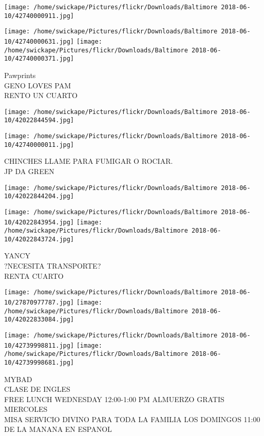 \documentclass[10pt,letterpaper]{article}
\begin{document}
\texttt{[image: /home/swickape/Pictures/flickr/Downloads/Baltimore 2018-06-10/42740000911.jpg]}

\vspace{0.25in}
\texttt{[image: /home/swickape/Pictures/flickr/Downloads/Baltimore 2018-06-10/42740000631.jpg]}
\texttt{[image: /home/swickape/Pictures/flickr/Downloads/Baltimore 2018-06-10/42740000371.jpg]}

Pawprints\\
GENO LOVES PAM\\
RENTO UN CUARTO\\
\pagebreak

\texttt{[image: /home/swickape/Pictures/flickr/Downloads/Baltimore 2018-06-10/42022844594.jpg]}

\vspace{0.25in}
\texttt{[image: /home/swickape/Pictures/flickr/Downloads/Baltimore 2018-06-10/42740000011.jpg]}

CHINCHES LLAME PARA FUMIGAR O ROCIAR.\\
JP DA GREEN\\
\pagebreak

\texttt{[image: /home/swickape/Pictures/flickr/Downloads/Baltimore 2018-06-10/42022844204.jpg]}

\vspace{0.25in}
\texttt{[image: /home/swickape/Pictures/flickr/Downloads/Baltimore 2018-06-10/42022843954.jpg]}
\texttt{[image: /home/swickape/Pictures/flickr/Downloads/Baltimore 2018-06-10/42022843724.jpg]}

YANCY\\
?NECESITA TRANSPORTE?\\
RENTA CUARTO\\
\pagebreak

\texttt{[image: /home/swickape/Pictures/flickr/Downloads/Baltimore 2018-06-10/27870977787.jpg]}
\texttt{[image: /home/swickape/Pictures/flickr/Downloads/Baltimore 2018-06-10/42022833084.jpg]}

\texttt{[image: /home/swickape/Pictures/flickr/Downloads/Baltimore 2018-06-10/42739998811.jpg]}
\texttt{[image: /home/swickape/Pictures/flickr/Downloads/Baltimore 2018-06-10/42739998681.jpg]}

MYBAD\\
CLASE DE INGLES\\
FREE LUNCH WEDNESDAY 12:00{-}1:00 PM ALMUERZO GRATIS MIERCOLES\\
MISA SERVICIO DIVINO PARA TODA LA FAMILIA LOS DOMINGOS 11:00 DE LA MANANA EN ESPANOL\\
\pagebreak
\end{document}
